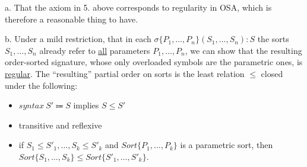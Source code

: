 \documentclass[UTF8,11pt]{article}
\theoremstyle{plain}
\theoremstyle{definition}
\theoremstyle{remark}
\begin{document}
a. That the axiom in 5. above corresponds to regularity in OSA, which is therefore a reasonable thing to have.

b. Under a mild restriction, that in each $\sigma \{P_1, \dots , P_n\}(S_1, \dots, S_n):S$ the sorts $S_1,\dots,S_n$ already refer to \underline{all} parameters $P_1, \dots , P_n$, we can show that the resulting order-sorted signature, whose only overloaded symbols are the parametric ones, is \underline{regular}. The ``resulting'' partial order on sorts is the least relation $\le$ closed under the following:

\begin{itemize}
\item $syntax\ S' \Coloneqq S$ implies $S \le S'$
\item transitive and reflexive
\item if $S_1 \le S'_1, \dots, S_k \le S'_k$ and $Sort\{P_1,\dots,P_k\}$ is a parametric sort, then $Sort\{S_1,\dots,S_k\} \le Sort\{S'_1,\dots,S'_k\}$.
\end{itemize}
\end{document}
